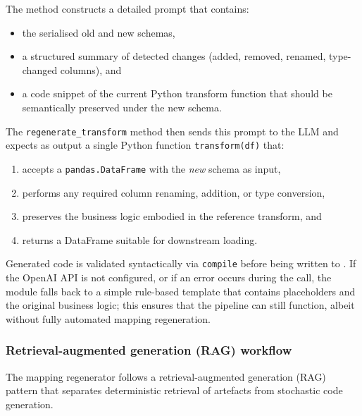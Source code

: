 The method  constructs a detailed prompt that
contains:
%
\begin{itemize}
  \item the serialised old and new schemas,
  \item a structured summary of detected changes (added, removed, renamed,
  type-changed columns), and
  \item a code snippet of the current Python transform function that should be
  semantically preserved under the new schema.
\end{itemize}

The \texttt{regenerate\_transform} method then sends this prompt to the LLM
and expects as output a single Python function \texttt{transform(df)} that:
%
\begin{enumerate}
  \item accepts a \texttt{pandas.DataFrame} with the \emph{new} schema as
  input,
  \item performs any required column renaming, addition, or type conversion,
  \item preserves the business logic embodied in the reference transform, and
  \item returns a DataFrame suitable for downstream loading.
\end{enumerate}

Generated code is validated syntactically via \texttt{compile} before being
written to . If the OpenAI API is not
configured, or if an error occurs during the call, the module falls back to a
simple rule-based template that contains placeholders and the original
business logic; this ensures that the pipeline can still function, albeit
without fully automated mapping regeneration.


\subsubsection{Retrieval-augmented generation (RAG) workflow}

The mapping regenerator follows a retrieval-augmented generation (RAG) pattern that separates
deterministic retrieval of artefacts from stochastic code generation.

